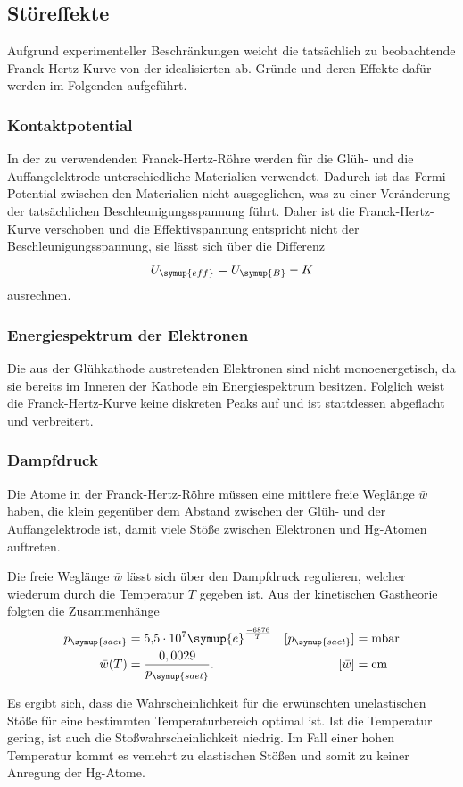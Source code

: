 \subsection{Störeffekte}
\label{sec:Störeffekte}
Aufgrund experimenteller Beschränkungen weicht die tatsächlich zu beobachtende Franck-Hertz-Kurve von der idealisierten ab. 
Gründe und deren Effekte dafür werden im Folgenden aufgeführt.

\subsubsection{Kontaktpotential}
In der zu verwendenden Franck-Hertz-Röhre werden für die Glüh- und die Auffangelektrode unterschiedliche Materialien verwendet. 
Dadurch ist das Fermi-Potential zwischen den Materialien nicht ausgeglichen, was zu einer Veränderung der tatsächlichen 
Beschleunigungsspannung führt. Daher ist die Franck-Hertz-Kurve verschoben und die Effektivspannung entspricht nicht der 
Beschleunigungsspannung, sie lässt sich über die Differenz
\begin{equation}
    U_{\symup{eff}} = U_{\symup{B}} - K
    \label{eq:Kontaktpotential}
\end{equation}
ausrechnen.

\subsubsection{Energiespektrum der Elektronen}
Die aus der Glühkathode austretenden Elektronen sind nicht monoenergetisch, da sie bereits im Inneren der Kathode ein Energiespektrum 
besitzen. Folglich weist die Franck-Hertz-Kurve keine diskreten Peaks auf und ist stattdessen abgeflacht und verbreitert.

\subsubsection{Dampfdruck}
Die Atome in der Franck-Hertz-Röhre müssen eine mittlere freie Weglänge $\bar{w}$ haben, die klein gegenüber dem Abstand zwischen 
der Glüh- und der Auffangelektrode ist, damit viele Stöße zwischen Elektronen und Hg-Atomen auftreten.

Die freie Weglänge $\bar{w}$ lässt sich über den Dampfdruck regulieren, welcher wiederum durch die Temperatur $T$ gegeben 
ist. Aus der kinetischen Gastheorie folgten die Zusammenhänge
\begin{align}
    p_{\symup{saet}} &= \num{5.5e7} \symup{e}^{\frac{-6876}{T}} & [p_{\symup{saet}}] &= \unit{\milli\bar} \label{eq:p_sät} \\
    \bar{w}(T) &= \frac{0,0029}{p_{\symup{saet}}}. & [\bar{w}] &= \unit{\centi\metre} \label{eq:freie weglänge}
\end{align}

Es ergibt sich, dass die Wahrscheinlichkeit für die erwünschten unelastischen Stöße für eine bestimmten Temperaturbereich optimal ist. Ist 
die Temperatur gering, ist auch die Stoßwahrscheinlichkeit niedrig. Im Fall einer hohen Temperatur kommt es vemehrt zu elastischen Stößen 
und somit zu keiner Anregung der Hg-Atome.
